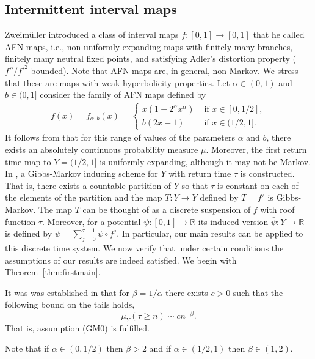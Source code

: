 \documentclass[12pt]{article}
\numberwithin{equation}{section}
\newcommand{\R}{\mathbb{R}}
\begin{document}
\subsection{Intermittent interval maps} \label{sec:int} Zweim\"uller \cite{zw} introduced a class of interval maps 
$f:[0,1] \to [0,1]$ that he called AFN maps, i.e., non-uniformly expanding maps with finitely many branches, 
finitely many neutral fixed points, and satisfying Adler's distortion property ($f''/f'^{2}$ bounded). 
Note that AFN maps are, in general, non-Markov. 
We stress that these are maps with weak hyperbolicity properties. Let $\alpha\in (0,1)$ and $b\in (0, 1]$ consider the 
family of AFN maps defined by
\begin{eqnarray*}
 f(x) = f_{\alpha, b}(x) = \begin{cases} x(1+ 2^\alpha x^\alpha) & \text{ if } x\in [0, 1/2],\\
b(2x-1) & \text{ if } x\in (1/2, 1].
\end{cases}
\end{eqnarray*}
It follows from \cite{zw} that for this range of values of the parameters $\alpha$ and $b$, 
there exists an absolutely continuous probability measure $\mu$. Moreover, the first return time map
to $Y= (1/2, 1]$ 
is uniformly expanding, although it may not be Markov. In \cite[Section 9]{BruTer18}, 
a Gibbs-Markov inducing scheme for $Y$ with return time $\tau$ is constructed. That is, there exists a countable partition 
of $Y$ so that $\tau$ is constant on each of the elements of the partition and the map $T:Y\to Y$ defined by $T=f^\tau$ is Gibbs-Markov.  
The map $T$ can be thought of as a discrete suspension of $f$ with roof function $\tau$. Moreover, for a potential $\psi:[0,1] \to \R$ 
its induced version $\bar \psi: Y \to \R$ is defined by $\bar \psi = \sum_{j=0}^{\tau -1} \psi \circ f^j$.
In particular, our main results can be applied to this discrete time system.  
We now verify that under certain conditions the assumptions of our results are indeed satisfied. We begin with Theorem~\ref{thm:firstmain}.


It was was established in \cite[Section 9]{BruTer18}  that for $\beta=1/\alpha$ there exists $c>0$ such that  the following bound on the tails holds,
\begin{equation*}
\mu_Y(\tau\ge n)\sim cn^{-\beta}.
\end{equation*}
That is, assumption (GM0) is fulfilled.  


Note that if $\alpha \in (0, 1/2)$ then $\beta > 2$  and   if $\alpha \in (1/2,1)$ then $\beta \in (1,2)$.
 
\end{document}
